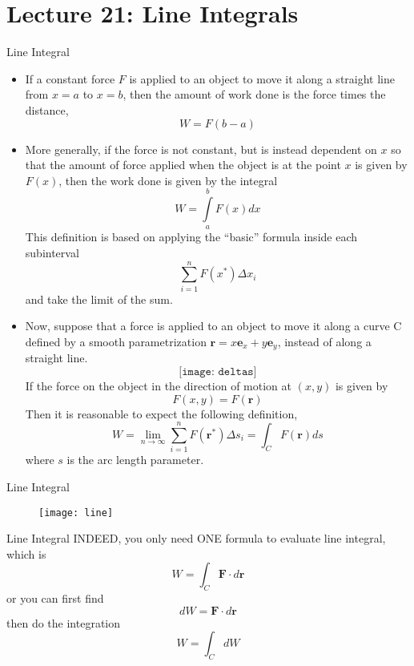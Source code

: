 \documentclass[10pt]{beamer}
\begin{document}
\section{Lecture 21: Line Integrals}
\begin{frame}[allowframebreaks]{ Line Integral}
\begin{itemize}
	\item If a constant force $F$ is applied to an object to move it along a straight line from
	$x = a$ to $ x = b$, then the amount of work done is the force times the distance,
	$$W = F(b-a)$$
	\item More generally, if the force is not constant, but is instead dependent on $x$ so
	that the amount of force applied when the object is at the point $x$ is given by
	$F(x)$, then the work done is given by the integral
	$$W = \int\limits_{a}^{b}F(x) dx$$
	This definition is based on applying the ``basic'' formula inside each subinterval
	$$\sum\limits_{i = 1}^{n}F(x^*)\Delta x_i$$
	and take the limit of the sum.
	\item Now, suppose that a force is applied to an object to move it along a curve C
	defined by a smooth parametrization $\mathbf{r} = x\mathbf{e}_x + y\mathbf{e}_y$, instead of along a straight line.
	$$\texttt{[image: deltas]}$$
	If the force on the object in the direction of motion at $(x, y)$ is given by
	$$F(x,y) = F(\mathbf{r})$$
	Then it is reasonable to expect the following definition,
	$$W = \lim\limits_{n\rightarrow\infty}\sum\limits_{i = 1}^{n}F(\mathbf{r}^*)\Delta s_i = \int_C F(\mathbf{r})ds$$
	where $s$ is the arc length parameter.
	
\end{itemize}

\end{frame}
\begin{frame}[allowframebreaks]{Line Integral}
	\begin{figure}[H]
		\centering
		\texttt{[image: line]}
	\end{figure}
	
\end{frame}
\begin{frame}[allowframebreaks]{Line Integral}
INDEED, you only need {\color{red}ONE} formula to evaluate line integral, which is
$$W = \int_C \mathbf{F}\cdot d\mathbf{r}$$
or you can first find $$dW = \mathbf{F}\cdot d\mathbf{r}$$
then do the integration $$W = \int_C dW$$
	
\end{frame}
\end{document}
